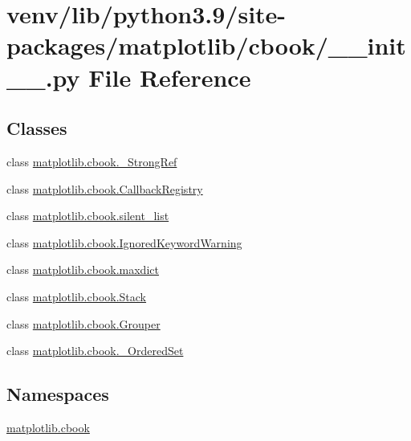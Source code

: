 \hypertarget{venv_2lib_2python3_89_2site-packages_2matplotlib_2cbook_2____init_____8py}{}\section{venv/lib/python3.9/site-\/packages/matplotlib/cbook/\+\_\+\+\_\+init\+\_\+\+\_\+.py File Reference}
\label{venv_2lib_2python3_89_2site-packages_2matplotlib_2cbook_2____init_____8py}
\subsection*{Classes}
\begin{DoxyCompactItemize}
\item 
class \hyperlink{classmatplotlib_1_1cbook_1_1__StrongRef}{matplotlib.\+cbook.\+\_\+\+Strong\+Ref}
\item 
class \hyperlink{classmatplotlib_1_1cbook_1_1CallbackRegistry}{matplotlib.\+cbook.\+Callback\+Registry}
\item 
class \hyperlink{classmatplotlib_1_1cbook_1_1silent__list}{matplotlib.\+cbook.\+silent\+\_\+list}
\item 
class \hyperlink{classmatplotlib_1_1cbook_1_1IgnoredKeywordWarning}{matplotlib.\+cbook.\+Ignored\+Keyword\+Warning}
\item 
class \hyperlink{classmatplotlib_1_1cbook_1_1maxdict}{matplotlib.\+cbook.\+maxdict}
\item 
class \hyperlink{classmatplotlib_1_1cbook_1_1Stack}{matplotlib.\+cbook.\+Stack}
\item 
class \hyperlink{classmatplotlib_1_1cbook_1_1Grouper}{matplotlib.\+cbook.\+Grouper}
\item 
class \hyperlink{classmatplotlib_1_1cbook_1_1__OrderedSet}{matplotlib.\+cbook.\+\_\+\+Ordered\+Set}
\end{DoxyCompactItemize}
\subsection*{Namespaces}
\begin{DoxyCompactItemize}
\item 
 \hyperlink{namespacematplotlib_1_1cbook}{matplotlib.\+cbook}
\end{DoxyCompactItemize}
